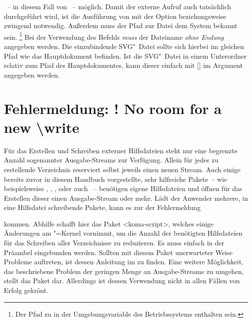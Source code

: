 ~-- in diesem Fall von ~-- möglich. Damit 
der externe Aufruf auch tatsächlich durchgeführt wird, ist die Ausführung von 
 mit der Option  beziehungsweise 
 zwingend notwendig. Außerdem muss der Pfad zur Datei 
 dem System bekannt sein.%
\footnote{%
  Der Pfad zu  in der Umgebungsvariable  des 
  Betriebssystems enthalten sein.%
}
Bei der Verwendung des Befehls  \emph{muss} der Dateiname 
\emph{ohne Endung} angegeben werden. Die einzubindende SVG"~Datei sollte sich 
hierbei im gleichen Pfad wie das Hauptdokument befinden. Ist die SVG"~Datei in 
einem Unterordner relativ zum Pfad des Hauptdokumentes, kann dieser einfach mit 
[] im Argument 
angegeben werden.



\section{Fehlermeldung: ! No room for a new \textbackslash write}
%
Für das Erstellen und Schreiben externer Hilfsdateien steht  nur 
eine begrenzte Anzahl sogenannter Ausgabe-Streams zur Verfügung. Allein für 
jedes zu erstellende Verzeichnis reserviert  selbst jeweils einen 
neuen Stream. Auch einige bereits zuvor in diesem Handbuch vorgestellte, sehr 
hilfreiche Pakete~-- wie beispielsweise , , 
,  oder auch ~-- 
benötigen eigene Hilfsdateien und öffnen für das Erstellen dieser einen 
Ausgabe-Stream oder mehr. Lädt der Anwender mehrere, in eine Hilfsdatei 
schreibende Pakete, kann es zur der Fehlermeldung
%
\begin{quoting}
\end{quoting}
%
kommen. Abhilfe schafft hier das Paket <koma-script>, welches 
einige Änderungen am "=Kernel vornimmt, um die Anzahl der 
benötigten Hilfsdateien für das Schreiben aller Verzeichnisse zu reduzieren. Es 
muss einfach in der Präambel eingebunden werden. Sollten mit diesem Paket 
unerwarteter Weise Probleme auftreten, ist dessen Anleitung im \scrguide zu 
finden. Eine weitere Möglichkeit, das beschriebene Problem der geringen Menge 
an Ausgabe-Streams zu umgehen, stellt das Paket  dar. 
Allerdings ist dessen Verwendung nicht in allen Fällen von Erfolg gekrönt.



